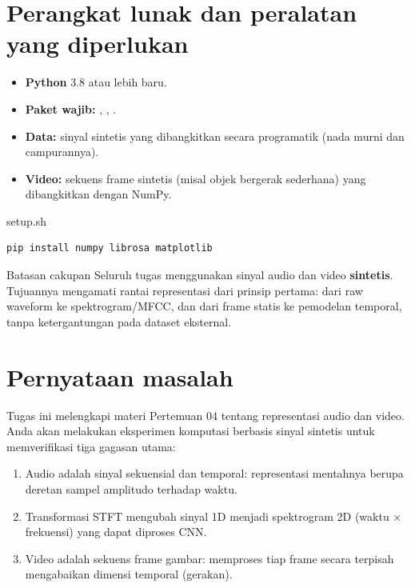 \documentclass[12pt, a4paper]{article}
\begin{document}
\section{Perangkat lunak dan peralatan yang diperlukan}\label{sec:requiredsw}

\begin{itemize}[itemsep=2pt,parsep=0pt,topsep=2pt,partopsep=2pt]
  \item[\color{ctpBlue}\faPython] \textbf{Python} 3.8 atau lebih baru.
  \item[\color{ctpBlue}\faFileCode] \textbf{Paket wajib:} , , .
  \item[\color{ctpBlue}\faWaveSquare] \textbf{Data:} sinyal sintetis yang dibangkitkan secara programatik (nada murni dan campurannya).
  \item[\color{ctpBlue}\faVideo] \textbf{Video:} sekuens frame sintetis (misal objek bergerak sederhana) yang dibangkitkan dengan NumPy.
\end{itemize}

\begin{codewindow}{setup.sh}
\begin{lstlisting}[style=pycode]
pip install numpy librosa matplotlib
\end{lstlisting}
\end{codewindow}

\begin{minipage}{\linewidth}
\begin{bclogo}[couleur=ctpMantle, arrondi=0.1, logo=\bcinfo, ombre=false, couleurBord=ctpSurface, epBord=0.6]{Batasan cakupan}
  Seluruh tugas menggunakan sinyal audio dan video \textbf{sintetis}. Tujuannya mengamati
  rantai representasi dari prinsip pertama: dari raw waveform ke spektrogram/MFCC,
  dan dari frame statis ke pemodelan temporal, tanpa ketergantungan pada dataset eksternal.
\end{bclogo}
\end{minipage}

\section{Pernyataan masalah}\label{sec:intro}

Tugas ini melengkapi materi Pertemuan 04 tentang representasi audio dan video. Anda akan melakukan eksperimen komputasi berbasis sinyal sintetis untuk memverifikasi tiga gagasan utama:
\begin{enumerate}
  \item Audio adalah sinyal sekuensial dan temporal: representasi mentahnya berupa deretan sampel amplitudo terhadap waktu.
  \item Transformasi STFT mengubah sinyal 1D menjadi spektrogram 2D (waktu $\times$ frekuensi) yang dapat diproses CNN.
  \item Video adalah sekuens frame gambar: memproses tiap frame secara terpisah mengabaikan dimensi temporal (gerakan).
\end{enumerate}
\end{document}
